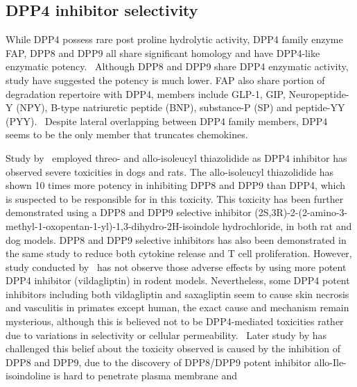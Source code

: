 \subsection{DPP4 inhibitor selectivity}
While DPP4 possess rare post proline hydrolytic activity, DPP4 family enzyme FAP, DPP8 and DPP9 all share significant homology and have DPP4-like enzymatic potency.~\cite{Kirby_2010,Thornberry_2007} Although DPP8 and DPP9 share DPP4 enzymatic activity, study have suggested the potency is much lower. FAP also share portion of degradation repertoire with DPP4, members include GLP-1, GIP, Neuropeptide-Y (NPY), B-type natriuretic peptide (BNP), substance-P (SP) and peptide-YY (PYY).~\cite{Keane_2011} Despite lateral overlapping between DPP4 family members, DPP4 seems to be the only member that truncates chemokines.~\cite{Keane_2011}  
\par 
Study by~\citet{Lankas2005} employed threo- and allo-isoleucyl thiazolidide as DPP4 inhibitor has observed severe toxicities in dogs and rats. The allo-isoleucyl thiazolidide has shown 10 times more potency in inhibiting DPP8 and DPP9 than DPP4, which is suspected to be responsible for in this toxicity. This toxicity has been further demonstrated using a DPP8 and DPP9 selective inhibitor (2S,3R)-2-(2-amino-3-methyl-1-oxopentan-1-yl)-1,3-dihydro-2H-isoindole hydrochloride, in both rat and dog models. DPP8 and DPP9 selective inhibitors has also been demonstrated in the same study to reduce both cytokine release and T cell proliferation. However, study conducted by~\citet{Burkey2008} has not observe those adverse effects by using more potent DPP4 inhibitor (vildagliptin) in rodent models. Nevertheless, some DPP4 potent inhibitors including both vildagliptin and saxagliptin seem to cause skin necrosis and vasculitis in primates except human, the exact cause and mechanism remain mysterious, although this is believed not to be DPP4-mediated toxicities rather due to variations in selectivity or cellular permeability.~\cite{Hoffmann2014} Later study by \citet{Bank2011} has challenged this belief about the toxicity observed is caused by the inhibition of DPP8 and DPP9, due to the discovery of DPP8/DPP9 potent inhibitor allo-Ile-isoindoline is hard to penetrate plasma membrane and  
\par 